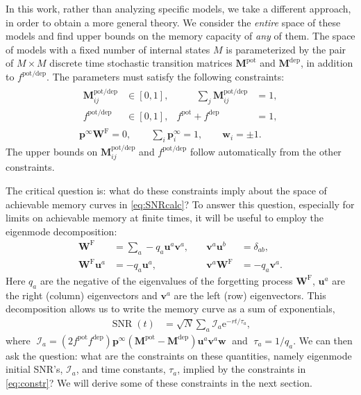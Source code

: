 \documentclass[9pt,twocolumn,twoside,lineno]{pnas-new}
\newcommand{\e}{\mathrm{e}}
\DeclareMathOperator{\snr}{SNR}
\newcommand{\prob}{\mathbf{p}}
\newcommand{\eq}{\prob^\infty}
\newcommand{\w}{\mathbf{w}}
\newcommand{\W}{\mathbf{W}}
\newcommand{\M}{\mathbf{M}}
\newcommand{\frg}{\W^{\mathrm{F}}}
\newcommand{\pot}{^{\text{pot}}}
\newcommand{\dep}{^{\text{dep}}}
\newcommand{\potdep}{^{\text{pot/dep}}}
\newcommand{\uv}{\mathbf{u}}
\newcommand{\vv}{\mathbf{v}}
\newcommand{\CI}{\mathcal{I}}
\begin{document}
In this work, rather than analyzing specific models,  we take a different approach, in order to obtain a more general theory.
We consider the \emph{entire} space of these models and find upper bounds on the memory capacity of \emph{any} of them.
The space of models with a fixed number of internal states $M$ is parameterized by the pair of $M \times M$ discrete time stochastic
transition matrices $\M\pot$ and $\M\dep$, in addition to $f\potdep$.  The parameters must satisfy the following constraints:
%
\begin{equation}\label{eq:constr}
\begin{gathered}
\begin{aligned}
  \M\potdep_{ij} &\in [0,1], &\qquad
  \sum_j \M\potdep_{ij} &= 1, \\
  f\potdep &\in [0,1],&
  f\pot + f\dep &= 1,
\end{aligned}
\\
  \eq\frg = 0, \qquad
  \sum_i \eq_i = 1, \qquad
  \w_i = \pm 1.
\end{gathered}
\end{equation}
%
The upper bounds on $\M\potdep_{ij}$ and $f\potdep$ follow automatically from the other constraints.

The critical question is: what do these constraints imply about the space of achievable memory curves in \cref{eq:SNRcalc}?
To answer this question, especially for limits on achievable memory at finite times, it will be useful to employ the eigenmode decomposition:
%
\begin{equation}\label{eq:eigendecomp}
\begin{aligned}
  \frg &= \sum_a -q_a \uv^a \vv^a,
  &\quad
  \vv^a \uv^b &= \delta_{ab},
  \\%
  \frg \uv^a &= -q_a \uv^a,
  &\quad
  \vv^a \frg &= -q_a \vv^a.
\end{aligned}
\end{equation}
%
Here $q_a$ are the negative of the eigenvalues of the forgetting process $\frg$, $\uv^a$ are the right (column) eigenvectors and $\vv^a$ are the left (row) eigenvectors.
This decomposition allows us to write the memory curve as a sum of exponentials,
%
\begin{equation}\label{eq:SNReigen}
\begin{aligned}
  \snr(t) &= \sqrt{N}\sum_a \CI_a \e^{-rt/\tau_a},
\end{aligned}
\end{equation}
%
where $\;\CI_a = (2 f\pot f\dep) \eq (\M\pot-\M\dep) \uv^a  \vv^a \w\;$ and $\;\tau_a = {1}/{q_a}$.
We can then ask the question: what are the constraints on these quantities, namely eigenmode initial SNR's, $\CI_a$, and time constants, $\tau_a$, implied by the constraints in \cref{eq:constr}?
We will derive some of these constraints in the next section.
\end{document}
